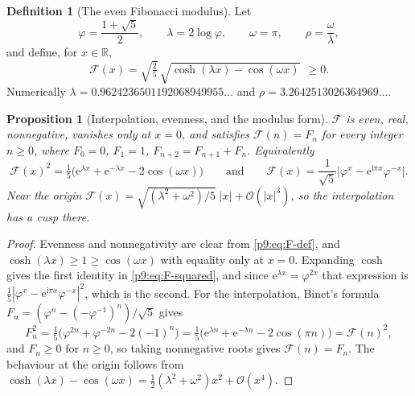 \documentclass[11pt,a4paper,oneside]{book}
\theoremstyle{plain}
\newtheorem{proposition}[theorem]{Proposition}
\theoremstyle{definition}
\newtheorem{definition}[theorem]{Definition}
\theoremstyle{remark}
\newcommand{\Real}{\mathbb{R}}
\newcommand{\e}{\mathrm{e}}
\newcommand{\ii}{\mathrm{i}}
\newcommand{\bigO}{\mathcal{O}}
\begin{document}
\begin{definition}[The even Fibonacci modulus]\label{p9:def:F}
Let
\begin{equation}\label{p9:eq:constants}
 \varphi=\frac{1+\sqrt5}2,
 \qquad
 \lambda=2\log\varphi,
 \qquad
 \omega=\pi,
 \qquad
 \rho=\frac\omega\lambda,
\end{equation}
and define, for $x\in\Real$,
\begin{equation}\label{p9:eq:F-def}
 \mathcal{F}(x)=\sqrt{\tfrac25}\,
 \sqrt{\cosh(\lambda x)-\cos(\omega x)}
 \ \ \ge0 .
\end{equation}
Numerically $\lambda=0.9624236501192068949955\ldots$ and
$\rho=3.2642513026364969\ldots$.
\end{definition}

\begin{proposition}[Interpolation, evenness, and the modulus form]
\label{p9:prop:interpolation}
$\mathcal{F}$ is even, real, nonnegative, vanishes only at $x=0$, and
satisfies $\mathcal{F}(n)=F_n$ for every integer $n\ge0$, where $F_0=0$,
$F_1=1$, $F_{n+2}=F_{n+1}+F_n$.  Equivalently
\begin{equation}\label{p9:eq:F-squared}
 \mathcal{F}(x)^{2}
 =\tfrac15\bigl(\e^{\lambda x}+\e^{-\lambda x}-2\cos(\omega x)\bigr)
 \qquad\text{and}\qquad
 \mathcal{F}(x)=\frac1{\sqrt5}\bigl|\varphi^{x}-\e^{\ii\pi x}\varphi^{-x}\bigr| .
\end{equation}
Near the origin $\mathcal{F}(x)=\sqrt{(\lambda^{2}+\omega^{2})/5}\;|x|
+\bigO(|x|^{3})$, so the interpolation has a cusp there.
\end{proposition}

\begin{proof}
Evenness and nonnegativity are clear from \eqref{p9:eq:F-def}, and
$\cosh(\lambda x)\ge1\ge\cos(\omega x)$ with equality only at $x=0$.
Expanding $\cosh$ gives the first identity in \eqref{p9:eq:F-squared}, and
since $\e^{\lambda x}=\varphi^{2x}$ that expression is
$\tfrac15|\varphi^{x}-\e^{\ii\pi x}\varphi^{-x}|^{2}$, which is the second.
For the interpolation, Binet's formula $F_n=(\varphi^{n}
-(-\varphi^{-1})^{n})/\sqrt5$ gives
\[
 F_n^{2}=\tfrac15\bigl(\varphi^{2n}+\varphi^{-2n}-2(-1)^{n}\bigr)
 =\tfrac15\bigl(\e^{\lambda n}+\e^{-\lambda n}-2\cos(\pi n)\bigr)
 =\mathcal{F}(n)^{2},
\]
and $F_n\ge0$ for $n\ge0$, so taking nonnegative roots gives
$\mathcal{F}(n)=F_n$.  The behaviour at the origin follows from
$\cosh(\lambda x)-\cos(\omega x)
=\tfrac12(\lambda^{2}+\omega^{2})x^{2}+\bigO(x^{4})$.
\end{proof}
\end{document}
